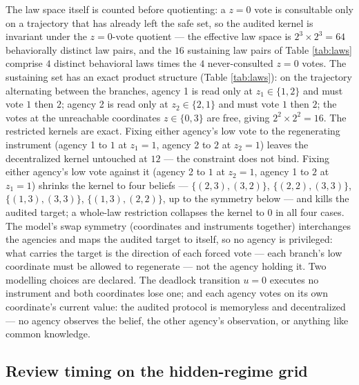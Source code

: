 \documentclass[10pt,twocolumn]{article}
\theoremstyle{definition}
\begin{document}
The law space itself is counted before quotienting: a \(z = 0\) vote is
consultable only on a trajectory that has already left the safe set, so
the audited kernel is invariant under the \(z{=}0\)-vote quotient ---
the effective law space is \(2^{3} \times 2^{3} = 64\) behaviorally
distinct law pairs, and the \(16\) sustaining law pairs of Table
\ref{tab:laws} comprise \(4\) distinct behavioral laws times the \(4\)
never-consulted \(z{=}0\) votes. The sustaining set has an
exact product structure (Table
\ref{tab:laws}): on the trajectory alternating between the branches,
agency 1 is read only at \(z_1 \in \{1, 2\}\) and must vote \(1\) then
\(2\); agency 2 is read only at \(z_2 \in \{2, 1\}\) and must vote
\(1\) then \(2\); the votes at the unreachable coordinates
\(z \in \{0, 3\}\) are free, giving \(2^{2} \times 2^{2} = 16\). The
restricted kernels are exact. Fixing either agency's low vote to the
regenerating instrument (agency 1 to \(1\) at \(z_1 = 1\), agency 2 to
\(2\) at \(z_2 = 1\)) leaves the decentralized kernel untouched at
\(12\) --- the constraint does not bind. Fixing either agency's low
vote against it (agency 2 to \(1\) at \(z_2 = 1\), agency 1 to \(2\)
at \(z_1 = 1\)) shrinks the kernel to four beliefs ---
\(\{(2,3),(3,2)\}\), \(\{(2,2),(3,3)\}\), \(\{(1,3),(3,3)\}\),
\(\{(1,3),(2,2)\}\), up to the symmetry below --- and kills the
audited target; a whole-law restriction collapses the kernel to \(0\)
in all four cases. The model's swap symmetry (coordinates and instruments
together) interchanges the agencies and maps the audited target to
itself, so no agency is privileged: what carries the target is the
direction of each forced vote --- each branch's low coordinate must be
allowed to regenerate --- not the agency holding it. Two modelling choices are declared. The deadlock transition
\(u = 0\) executes no instrument and both coordinates lose one; and
each agency votes on its own coordinate's current value: the audited
protocol is memoryless and decentralized --- no agency observes the
belief, the other agency's observation, or anything like common
knowledge.

\subsection{Review timing on the hidden-regime grid}\label{timing}
\end{document}
